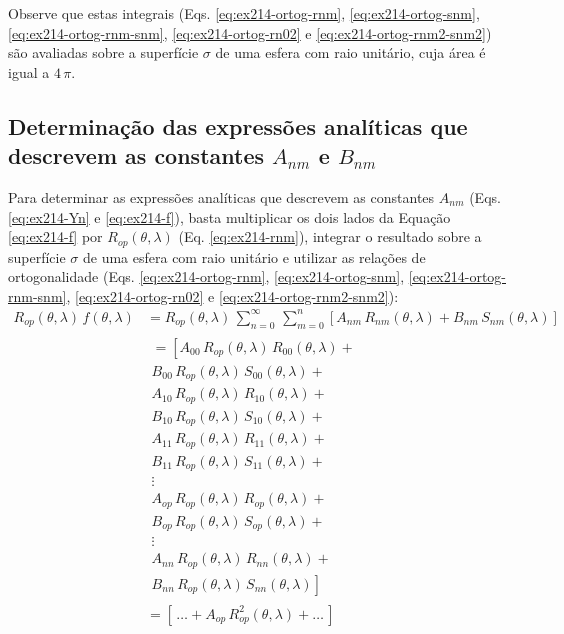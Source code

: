 \documentclass[10pt,a4paper,fleqn]{article}
\begin{document}
Observe que estas integrais (Eqs. \ref{eq:ex214-ortog-rnm}, \ref{eq:ex214-ortog-snm}, \ref{eq:ex214-ortog-rnm-snm},
\ref{eq:ex214-ortog-rn02} e \ref{eq:ex214-ortog-rnm2-snm2}) s\~{a}o avaliadas sobre a superf\'{i}cie $\sigma$ de uma esfera
com raio unit\'{a}rio, cuja \'{a}rea \'{e} igual a $4 \, \pi$.


\subsection{Determina\c{c}\~{a}o das expressões analíticas que descrevem as constantes $A_{nm}$ e $B_{nm}$}

Para determinar as expressões analíticas que descrevem as constantes $A_{nm}$ (Eqs. \ref{eq:ex214-Yn} e 
\ref{eq:ex214-f}), basta multiplicar os 
dois lados da Equa\c{c}ão \ref{eq:ex214-f} por $R_{op}(\theta,\lambda)$ (Eq. \ref{eq:ex214-rnm}), integrar o resultado sobre 
a superf\'{i}cie $\sigma$ de uma esfera com raio unit\'{a}rio e utilizar as rela\c{c}\~{o}es de ortogonalidade 
(Eqs. \ref{eq:ex214-ortog-rnm}, \ref{eq:ex214-ortog-snm}, \ref{eq:ex214-ortog-rnm-snm}, \ref{eq:ex214-ortog-rn02} e 
\ref{eq:ex214-ortog-rnm2-snm2}):
\begin{equation}
\begin{split}
R_{op}(\theta,\lambda) \, f(\theta,\lambda)
& = R_{op}(\theta,\lambda) \, \sum_{n=0}^{\infty} \,
\sum_{m=0}^{n} \left[ 
A_{nm} \, R_{nm}(\theta, \lambda) +
B_{nm} \, S_{nm}(\theta, \lambda)
\right] \\
& \begin{array}{r} =
\left[ A_{00} \, R_{op}(\theta,\lambda) \, R_{00}(\theta, \lambda) \right. + \\
B_{00} \, R_{op}(\theta,\lambda) \, S_{00}(\theta, \lambda) + \\
A_{10} \, R_{op}(\theta,\lambda) \, R_{10}(\theta, \lambda) + \\
B_{10} \, R_{op}(\theta,\lambda) \, S_{10}(\theta, \lambda) + \\
A_{11} \, R_{op}(\theta,\lambda) \, R_{11}(\theta, \lambda) + \\
B_{11} \, R_{op}(\theta,\lambda) \, S_{11}(\theta, \lambda) + \\
\vdots \quad \quad \quad \quad \quad \\
A_{op} \, R_{op}(\theta,\lambda) \, R_{op}(\theta, \lambda) + \\
B_{op} \, R_{op}(\theta,\lambda) \, S_{op}(\theta, \lambda) + \\
\vdots \quad \quad \quad \quad \quad \\
A_{nn} \, R_{op}(\theta,\lambda) \, R_{nn}(\theta, \lambda) + \\
\left. B_{nn} \, R_{op}(\theta,\lambda) \, S_{nn}(\theta, \lambda) \right]
\end{array} \\
& = \left[ \, \hdots + A_{op} \, R_{op}^{2}(\theta,\lambda) + \hdots \, \right]
\end{split}
\label{eq:ex214-int-Anm-desenvolv}
\end{equation}
\end{document}
